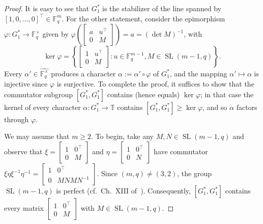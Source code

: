 \begin{proof}
It is easy to see that $G_1^*$ is the stabilizer of the line spanned by $[1,0,\ldots,0]^\top\in\mathbb{F}_q^m$.
For the other statement, consider the epimorphism $\varphi \colon G_1^* \to \mathbb{F}_q^\times$ given by $\varphi\left( \begin{bmatrix} a & u^\top \\ 0 & M \end{bmatrix} \right) = a = (\det M)^{-1}$,
with
\[ \ker \varphi =\left\{
\begin{bmatrix}
1&u^\top\\0&M
\end{bmatrix}
:u\in\mathbb{F}_q^{m-1},M\in\operatorname{SL}(m-1,q)
\right\}.
\]
Every $\alpha' \in \widehat{ \mathbb{F}_q^\times }$ produces a character $\alpha := \alpha' \circ \varphi$ of $G_1^*$, and the mapping $\alpha' \mapsto \alpha$ is injective since $\varphi$ is surjective.
To complete the proof, it suffices to show that the commutator subgroup $[G_1^*,G_1^*]$ contains (hence equals) $\ker \varphi$;
in that case the kernel of every character $\alpha \colon G_1^* \to \mathbb{T}$ contains $[G_1^*, G_1^*] \geq \ker \varphi$, and so $\alpha$ factors through $\varphi$.

We may assume that $m \geq 2$.
To begin, take any $M,N \in \operatorname{SL}(m-1,q)$ and observe that $\xi = \begin{bmatrix} 1 & 0^\top \\ 0 & M \end{bmatrix}$ and $\eta = \begin{bmatrix} 1 & 0^\top \\ 0 & N \end{bmatrix}$ have commutator
$\xi \eta \xi^{-1} \eta^{-1} = \begin{bmatrix} 1 & 0^\top \\ 0 & MNMN^{-1} \end{bmatrix}$.
Since $(m,q) \neq (3,2)$, the group $\operatorname{SL}(m-1,q)$ is perfect (cf.\ Ch.~XIII of~\cite{Lang:02}).
Consequently, $[G_1^*,G_1^*]$ contains every matrix $\begin{bmatrix} 1 & 0^\top \\ 0 & M \end{bmatrix}$ with $M \in \operatorname{SL}(m-1,q)$.


\end{proof}
